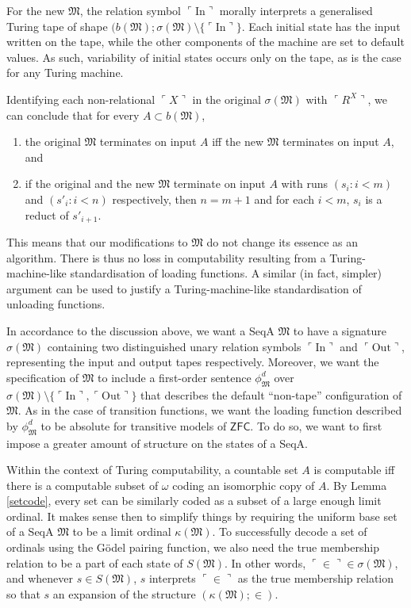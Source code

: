 \documentclass[12pt, twoside]{memoir}
\numberwithin{equation}{section}
\theoremstyle{definition}
\theoremstyle{remark}
\theoremstyle{definition}
\theoremstyle{definition}
\theoremstyle{definition}
\theoremstyle{remark}
\begin{document}
For the new $\mathfrak{M}$, the relation symbol $\ulcorner \mathrm{In} \urcorner$ morally interprets a generalised Turing tape of shape $(b(\mathfrak{M}); \sigma(\mathfrak{M}) \setminus \{\ulcorner \mathrm{In} \urcorner\}$. Each initial state has the input written on the tape, while the other components of the machine are set to default values. As such, variability of initial states occurs only on the tape, as is the case for any Turing machine. 

Identifying each non-relational $\ulcorner X \urcorner$ in the original $\sigma(\mathfrak{M})$ with $\ulcorner R^X \urcorner$, we can conclude that for every $A \subset b(\mathfrak{M})$, 
\begin{enumerate}[label=(\arabic*)]
    \item the original $\mathfrak{M}$ terminates on input $A$ iff the new $\mathfrak{M}$ terminates on input $A$, and
    \item if the original and the new $\mathfrak{M}$ terminate on input $A$ with runs $(s_i : i < m)$ and $(s'_i : i < n)$ respectively, then $n = m + 1$ and for each $i < m$, $s_i$ is a reduct of $s'_{i+1}$.
\end{enumerate} 
This means that our modifications to $\mathfrak{M}$ do not change its essence as an algorithm. There is thus no loss in computability resulting from a Turing-machine-like standardisation of loading functions. A similar (in fact, simpler) argument can be used to justify a Turing-machine-like standardisation of unloading functions.

In accordance to the discussion above, we want a SeqA $\mathfrak{M}$ to have a signature $\sigma(\mathfrak{M})$ containing two distinguished unary relation symbols $\ulcorner \mathrm{In} \urcorner$ and $\ulcorner \mathrm{Out} \urcorner$, representing the input and output tapes respectively. Moreover, we want the specification of $\mathfrak{M}$ to include a first-order sentence $\phi^d_{\mathfrak{M}}$ over $\sigma(\mathfrak{M}) \setminus \{\ulcorner \mathrm{In} \urcorner, \ulcorner \mathrm{Out} \urcorner\}$ that describes the default ``non-tape'' configuration of $\mathfrak{M}$. As in the case of transition functions, we want the loading function described by $\phi^d_{\mathfrak{M}}$ to be absolute for transitive models of $\mathsf{ZFC}$. To do so, we want to first impose a greater amount of structure on the states of a SeqA.

Within the context of Turing computability, a countable set $A$ is computable iff there is a computable subset of $\omega$ coding an isomorphic copy of $A$. By Lemma \ref{setcode}, every set can be similarly coded as a subset of a large enough limit ordinal. It makes sense then to simplify things by requiring the uniform base set of a SeqA $\mathfrak{M}$ to be a limit ordinal $\kappa(\mathfrak{M})$. To successfully decode a set of ordinals using the G\"{o}del pairing function, we also need the true membership relation to be a part of each state of $S(\mathfrak{M})$. In other words, $\ulcorner \in \urcorner \in \sigma(\mathfrak{M})$, and whenever $s \in S(\mathfrak{M})$, $s$ interprets $\ulcorner \in \urcorner$ as the true membership relation so that $s$ an expansion of the structure $(\kappa(\mathfrak{M}); \in)$.
\end{document}
